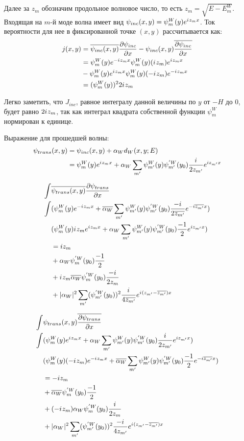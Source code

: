 Далее за $z_m$ обозначим продольное волновое число, то есть $z_m = \sqrt{E - E^W_m}$. Входящая на $m$-й моде волна имеет вид $\psi_{inc}(x, y) = \psi_m^W(y) e^{{i\mkern1mu} z_m x}$. Ток вероятности для нее в фиксированной точке $(x, y)$ рассчитывается как:
\begin{align*}
j(x, y)
&= \overline{\psi_{inc}(x, y)} \pdv{\psi_{inc}}{x} (x, y) - \psi_{inc}(x, y) \overline{ \pdv{\psi_{inc}}{x} (x, y)} \\
&= \psi_m^W(y) e^{-{i\mkern1mu} z_m x} \psi_m^W(y) ({i\mkern1mu} z_m) e^{{i\mkern1mu} z_m x} \\
&- \psi_m^W(y) e^{{i\mkern1mu} z_m x} \psi_m^W(y) (-{i\mkern1mu} z_m) e^{-{i\mkern1mu} z_m x} \\
&= (\psi_m^W(y))^2 2 {i\mkern1mu} z_m
\end{align*}

Легко заметить, что $J_{inc}$, равное интегралу данной величины по $y$ от $-H$ до $0$, будет равно $2 {i\mkern1mu} z_m$, так как интеграл квадрата собственной функции $\psi_m^W$ нормирован к единице.

Выражение для прошедшей волны:
\begin{align*}
\psi_{trans}(x, y)
&= \psi_{inc}(x, y) + \alpha_W d_W(x, y; E) \\
&= \psi_m^W(y) e^{{i\mkern1mu} z_m x} + \alpha_W \sum_{m'} \psi_{m'}^W(y) \psi_{m'}^{'W}(y_0) \frac{{i\mkern1mu}}{2 z_{m'}} e^{i z_{m'} x}
\end{align*}

\begin{align*}
\int & \overline{\psi_{trans}(x, y)} \pdv{\psi_{trans}}{x} (x, y) \\
\int
& (\psi_m^W(y) e^{-{i\mkern1mu} z_m x} + \overline{\alpha_W} \sum_{m'} \psi_{m'}^W(y) \psi_{m'}^{'W}(y_0) \frac{-{i\mkern1mu}}{2 \overline{z_{m'}}} e^{-i \overline{z_{m'}} x}) \\
& (\psi_m^W(y) {i\mkern1mu} z_m e^{{i\mkern1mu} z_m x} + \alpha_W \sum_{m'} \psi_{m'}^W(y) \psi_{m'}^{'W}(y_0) \frac{-1}{2} e^{i z_{m'} x}) \\
&= i z_m \\
&+ \alpha_W \psi_{m}^{'W}(y_0) \frac{-1}{2} \\
&+ {i\mkern1mu} z_m \overline{\alpha_W} \psi_{m}^{'W}(y_0) \frac{-{i\mkern1mu}}{2 z_{m}} \\
&+ |\alpha_W|^2 \sum_{m'} (\psi_{m'}^{'W}(y_0))^2 \frac{{i\mkern1mu}}{4 \overline{z_{m'}}} e^{{i\mkern1mu} (z_{m'} - \overline{z_{m'}}) x}
\end{align*}

\begin{align*}
\int & \psi_{trans}(x, y) \overline{\pdv{\psi_{trans}}{x} (x, y)} \\
\int
& (\psi_m^W(y) e^{{i\mkern1mu} z_m x} + \alpha_W \sum_{m'} \psi_{m'}^W(y) \psi_{m'}^{'W}(y_0) \frac{{i\mkern1mu}}{2 z_{m'}} e^{i z_{m'} x}) \\
& (\psi_m^W(y) (-{i\mkern1mu} z_m) e^{-{i\mkern1mu} z_m x} + \overline{\alpha_W} \sum_{m'} \psi_{m'}^W(y) \psi_{m'}^{'W}(y_0) \frac{-1}{2} e^{-i \overline{z_{m'}} x}) \\
&= -i z_m \\
&+ \overline{\alpha_W} \psi_{m}^{'W}(y_0) \frac{-1}{2} \\
&+ (-{i\mkern1mu} z_m) \alpha_W \psi_{m}^{'W}(y_0) \frac{{i\mkern1mu}}{2 z_{m}} \\
&+ |\alpha_W|^2 \sum_{m'} (\psi_{m'}^{'W}(y_0))^2 \frac{-{i\mkern1mu}}{4 z_{m'}} e^{{i\mkern1mu} (z_{m'} - \overline{z_{m'}}) x}
\end{align*}

